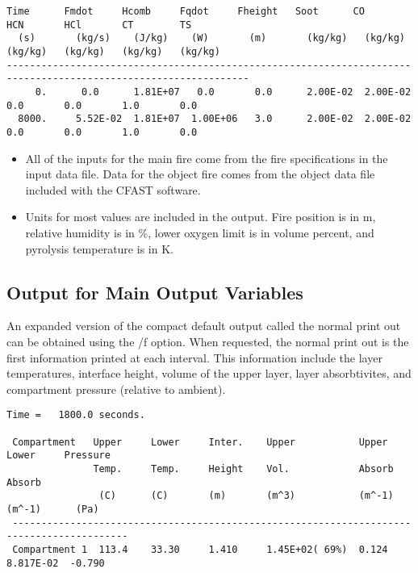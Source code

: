 \begin{lstlisting}[basicstyle=\tiny]
  Time      Fmdot     Hcomb     Fqdot     Fheight   Soot      CO        HCN       HCl       CT        TS
  (s)       (kg/s)    (J/kg)    (W)       (m)       (kg/kg)   (kg/kg)   (kg/kg)   (kg/kg)   (kg/kg)   (kg/kg)
----------------------------------------------------------------------------------------------------------------
     0.      0.0      1.81E+07   0.0       0.0      2.00E-02  2.00E-02   0.0       0.0       1.0       0.0
  8000.     5.52E-02  1.81E+07  1.00E+06   3.0      2.00E-02  2.00E-02   0.0       0.0       1.0       0.0
\end{lstlisting}

\begin{itemize}
\item All of the inputs for the main fire come from the fire specifications in the input data file. Data for the object fire comes from the object data file included with the CFAST software.
\item Units for most values are included in the output.  Fire position is in m, relative humidity is in \%, lower oxygen limit is in volume percent, and pyrolysis temperature is in K.
\end{itemize}

\subsection{Output for Main Output Variables}

An expanded version of the compact default output called the normal print out can be obtained using the /f option.  When requested, the normal print out is the first information printed at each interval.  This information include the layer temperatures, interface height, volume of the upper layer, layer absorbtivites, and compartment pressure (relative to ambient).

\begin{lstlisting}[basicstyle=\tiny]
 Time =   1800.0 seconds.

 Compartment   Upper     Lower     Inter.    Upper           Upper      Lower     Pressure
               Temp.     Temp.     Height    Vol.            Absorb     Absorb
                (C)      (C)       (m)       (m^3)           (m^-1)     (m^-1)      (Pa)
 ------------------------------------------------------------------------------------------
 Compartment 1  113.4    33.30     1.410     1.45E+02( 69%)  0.124      8.817E-02  -0.790
\end{lstlisting}

